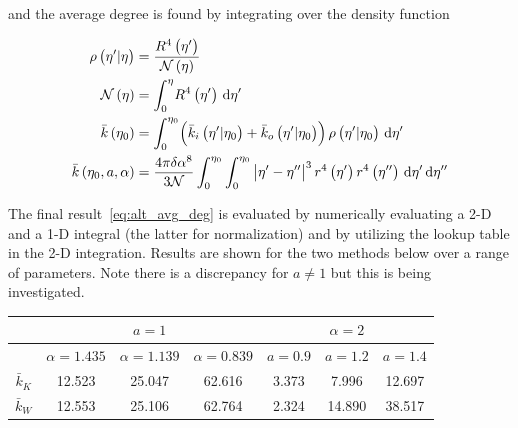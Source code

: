 \documentclass[preprint,notitlepage,amsmath,amssymb,floatfix]{revtex4-1}
\begin{document}
\noindent and the average degree is found by integrating over the density function

\begin{align}
\rho\left(\eta^\prime|\eta\right) &= \frac{R^4\left(\eta^\prime\right)}{\mathcal{N}\left(\eta\right)} \\
\mathcal{N}\left(\eta\right) &= \int_0^\eta\!R^4\left(\eta^\prime\right)\,\mathrm d\eta^\prime \\
\bar{k}\left(\eta_0\right) &= \int_0^{\eta_0}\!\left(\bar{k}_i\left(\eta^\prime|\eta_0\right) + \bar{k}_o\left(\eta^\prime|\eta_0\right)\right)\rho\left(\eta^\prime|\eta_0\right)\,\mathrm d\eta^\prime \\
\bar{k}\left(\eta_0,a,\alpha\right) &= \frac{4\pi\delta\alpha^8}{3\mathcal{N}}\int_0^{\eta_0}\int_0^{\eta_0}\,\abs{\eta^\prime - \eta^{\prime\prime}}^3 r^4\left(\eta^\prime\right)r^4\left(\eta^{\prime\prime}\right)\,\mathrm d\eta^\prime\,\mathrm d\eta^{\prime\prime} \label{eq:alt_avg_deg}
\end{align}

\noindent The final result~\eqref{eq:alt_avg_deg} is evaluated by numerically evaluating a 2-D and a 1-D integral (the latter for normalization) and by utilizing the lookup table in the 2-D integration.
Results are shown for the two methods below over a range of parameters.
Note there is a discrepancy for $a \neq 1$ but this is being investigated.

\begin{center}
\begin{tabular}{|c||c|c|c||c|c|c|}
  \hline
  & \multicolumn{3}{|c||}{$a = 1$} & \multicolumn{3}{|c|}{$\alpha = 2$} \\ \hline
  & $\alpha = 1.435$ & $\alpha = 1.139$ & $\alpha = 0.839$ & $a = 0.9$ & $a = 1.2$ & $a = 1.4$ \\ \hline
  $\bar{k}_K$ & 12.523 & 25.047 & 62.616 & 3.373 & 7.996 & 12.697 \\ \hline
  $\bar{k}_W$ & 12.553 & 25.106 & 62.764 & 2.324 & 14.890 & 38.517 \\
  \hline
\end{tabular}
\end{center}
\end{document}
